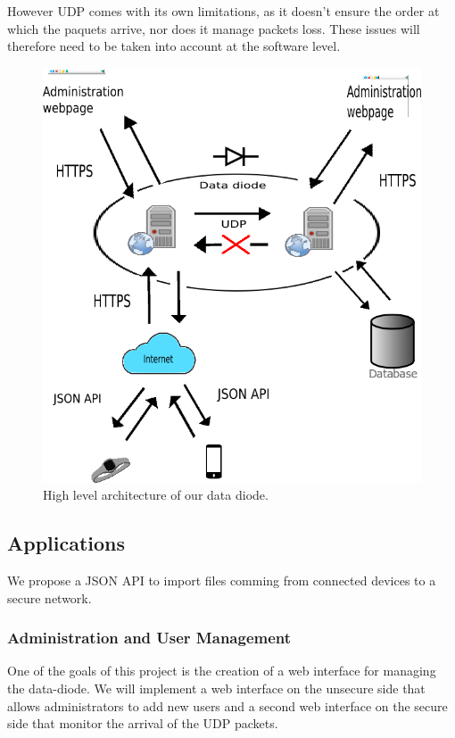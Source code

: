 \documentclass[a4paper,11pt]{article}
\begin{document}
However UDP comes with its own limitations, as it doesn't ensure the order at which the paquets arrive, nor does it manage packets loss. These issues will therefore need to be taken into account at the software level.


\begin{figure}
	\includegraphics[scale=0.7]{img/system.png}
	\caption{High level architecture of our data diode.}
\end{figure}


\subsection{Applications}

We propose a JSON API to import files comming from connected devices to a secure network.

\subsubsection{Administration and User Management}
\label{sec:administration}
One of the goals of this project is the creation of a web interface for managing the data-diode. We will implement a web interface on the unsecure side that allows administrators to add new users and a second web interface on the secure side that monitor the arrival of the UDP packets.
\end{document}
